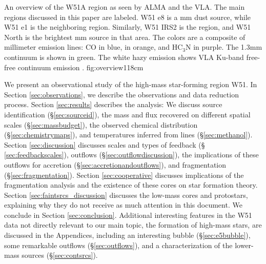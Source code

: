 \documentclass{emulateapj}
\begin{document}
{An overview of the W51A region as seen by ALMA and the VLA.  The main regions
discussed in this paper are labeled.  W51 e8 is a mm dust source, while W51 e1
is the neighboring \hii region.  Similarly, W51 IRS2 is the \hii region, and
W51 North is the brightest mm source in that area.  The colors are a composite
of millimeter emission lines: CO in blue, \methanol in orange, and HC$_3$N in
purple.  The 1.3mm continuum is shown in green.  The white hazy emission
shows VLA Ku-band free-free continuum emission
\citep{Ginsburg2016b}.}
{fig:overview}{1}{18cm}


 We present an
observational study of the high-mass star-forming region W51.  In Section
\ref{sec:observations}, we describe the observations and data reduction
process.  Section \ref{sec:results} describes the analysis:
We discuss source identification (\S \ref{sec:sourceid}),
the mass and flux recovered on different
spatial scales (\S \ref{sec:massbudget}),
the observed chemical distribution (\S \ref{sec:chemistrymaps}), and
temperatures inferred from \methanol lines (\S \ref{sec:methanol}).
Section \ref{sec:discussion} discusses scales and types of feedback (\S
\ref{sec:feedbackscales}), outflows (\S \ref{sec:outflowdiscussion}),
the implications of these outflows for accretion (\S \ref{sec:accretionandoutflows}),
and fragmentation (\S \ref{sec:fragmentation}).  
Section \ref{sec:cooperative} discusses implications
of the fragmentation analysis and the existence of these cores on star
formation theory.  Section \ref{sec:faintsrcs_discussion} discusses the
low-mass cores and protostars, explaining why they do not receive
as much attention in this document.
We conclude in Section \ref{sec:conclusion}.
Additional interesting features in the W51 data not directly relevant
to our main topic, the formation of high-mass stars,
are discussed in the Appendices, including
an interesting bubble (\S \ref{sec:e5bubble}), some remarkable outflows 
(\S \ref{sec:outflows}), and a characterization of the lower-mass sources
(\S \ref{sec:contsrcs}).

\end{document}
